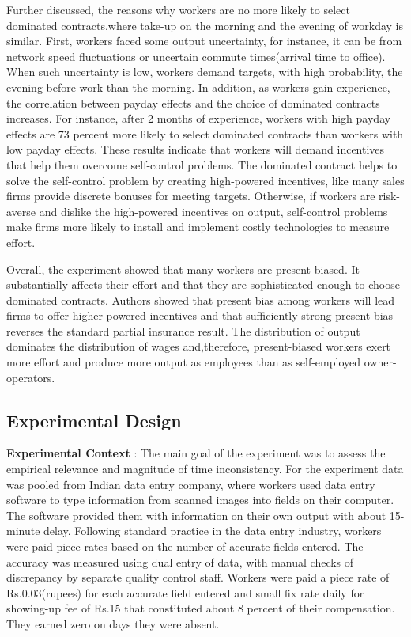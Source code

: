 \documentclass[a4paper,12pt]{article}
\begin{document}
Further discussed, the reasons why workers are no more likely to select dominated contracts,where take-up on the morning and the evening of workday is similar. First, workers faced some output uncertainty, for instance, it can be from network speed fluctuations or uncertain commute times(arrival time to office). When such uncertainty is low, workers demand targets, with high probability, the evening before work than the morning. In addition, as workers gain experience, the correlation between payday effects and the choice of dominated contracts increases. For instance, after 2 months of experience, workers with high payday effects are 73 percent more likely to select dominated contracts than workers with low payday effects. These results indicate that workers will demand incentives that help them overcome self-control problems. The dominated contract helps to solve the self-control problem by creating high-powered incentives, like many sales firms provide discrete bonuses for meeting targets. Otherwise, if workers are risk-averse and dislike the high-powered incentives on output, self-control problems make firms more likely to install and implement costly technologies to measure effort. 

Overall, the experiment showed that many workers are present biased. It substantially affects their effort and that they are sophisticated enough to choose dominated contracts. Authors showed that present bias among workers will lead firms to offer higher-powered incentives and that sufficiently strong present-bias reverses the standard partial insurance result. The distribution of output dominates the distribution of wages and,therefore, present-biased workers exert more effort and produce more output as employees than as self-employed owner-operators. 




\subsection{Experimental Design}

\textbf{Experimental Context }: 
The main goal of the experiment was to assess the empirical relevance and magnitude of time inconsistency. 
For the experiment data was pooled from Indian data entry company, where workers used data entry software to type information from scanned images into fields on their computer. The software provided them with information on their own output with about 15-minute delay. Following standard practice in the data entry industry, workers were paid piece rates based on the number of accurate fields entered. The accuracy was measured using dual entry of data, with manual checks of discrepancy by separate quality control staff. Workers were paid a piece rate of Rs.0.03(rupees) for each accurate field entered and small fix rate daily for showing-up fee of Rs.15 that constituted about 8 percent of their compensation. They earned zero on days they were absent. 
\end{document}
